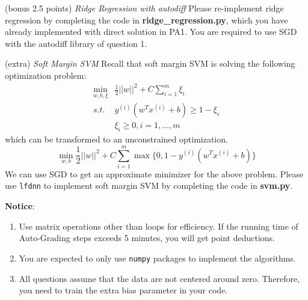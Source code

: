 \documentclass[a4paper, 12pt]{exam}
\begin{document}
\begin{questions}
		\question (bonus 2.5 points) \emph{Ridge Regression with autodiff}
		Please re-implement ridge regression by completing the code in \textbf{ridge\_regression.py}, which you have already implemented with direct solution in PA1.
		You are required to use SGD with the autodiff library of question 1.

		\question (extra) \emph{Soft Margin SVM}
		Recall that soft margin SVM is solving
		the following optimization problem:
		\begin{align*}
		    \min_{w,b,\xi}& \frac{1}{2}||w||^2 + C \sum_{i=1}^m \xi_i \\
		    s.t.\, &y^{(i)} (w^T x^{(i)} + b) \geq 1 -\xi_i \\
		    &\xi_i \geq 0, i=1,\dots, m
		\end{align*}
		which can be transformed to an unconstrained
		optimization.
		\begin{equation*}
		    \min_{w, b} \frac{1}{2}||w||^2  + C\sum_{i=1}^m \max\{0, 1 - y^{(i)} (w^T x^{(i)} + b) \}
		\end{equation*}
		We can use SGD to get an approximate minimizer for the above problem.
		Please use \texttt{lfdnn} to implement soft margin SVM by completing the code in \textbf{svm.py}.		
	\end{questions}
	
	
	\nocite{*}
	\begin{flushleft}
		\textbf{Notice}: \\
		\begin{enumerate}
			\item Use matrix operations other than loops for efficiency. If the running time of Auto-Grading steps exceeds 5 minutes, you will get point deductions.
			\item You are expected to only use \texttt{numpy} packages to implement the algorithms.
			\item All questions assume that the data are not centered around zero. Therefore, you need to train the extra bias parameter in your code.
		\end{enumerate}
	\end{flushleft}
	
\end{document}
